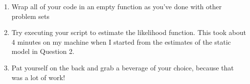 \documentclass[12pt,english]{article}
\begin{document}
\begin{enumerate}
\begin{enumerate}
    \item Wrap all of your code in an empty function as you've done with other problem sets
    \item Try executing your script to estimate the likelihood function. This took about 4 minutes on my machine when I started from the estimates of the static model in Question 2.
    \item Pat yourself on the back and grab a beverage of your choice, because that was a lot of work!
    \end{enumerate}




\end{enumerate}
\end{document}
